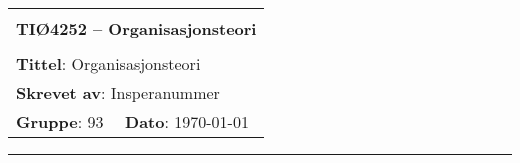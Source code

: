 \documentclass[a4paper,11pt,norsk]{article}
\begin{document}
\setcounter{page}{0}

\begin{minipage}[c]{0.15\textwidth}
\end{minipage}
\begin{minipage}[c]{0.85\textwidth}


\renewcommand{\arraystretch}{1.7}
\large 
\begin{tabularx}{\textwidth}{|X|X|}
\hline
\multicolumn{2}{|l|}{} \\
\multicolumn{2}{|l|}{\huge \textbf{TIØ4252 -- Organisasjonsteori}} \\
\multicolumn{2}{|l|}{}  \\
\hline
\multicolumn{2}{|l|}{\textbf{Tittel}:  
Organisasjonsteori
} \\
\hline
\multicolumn{2}{|l|}{\textbf{Skrevet av}:
Insperanummer
} \\
\hline
\textbf{Gruppe}: 93  & \textbf{Dato}: \today
\\
\hline 
\end{tabularx}
\end{minipage}
\normalsize

\newpage


\pagestyle{fancy}
\fancyhf{}
\renewcommand{\footrulewidth}{0.5pt}

\clearpage

\setlength{\parskip}{1ex}
\renewcommand{\baselinestretch}{0.1}\normalsize
\tableofcontents
\renewcommand{\baselinestretch}{1.00}\normalsize
\setlength{\parskip}{2ex}
\rule{\textwidth}{0.5pt}


\newpage






{}

\begingroup
\makeatletter
\makeatother
{}


\endgroup

\nocite{*} %
\clearpage
\appendix

\end{document}
